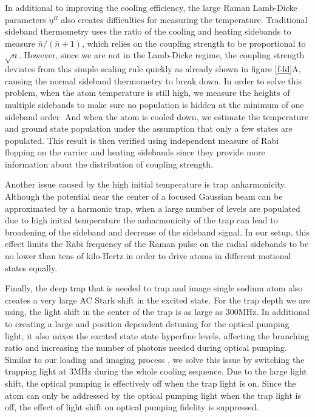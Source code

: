 \documentclass[aps,prl,twocolumn,groupedaddress]{revtex4-1}
\begin{document}
In additional to improving the cooling efficiency, the large Raman Lamb-Dicke parameters $\eta^R$
also creates difficulties for measuring the temperature. Traditional sideband thermometry uses
the ratio of the cooling and heating sidebands to measure $\bar n / (\bar n + 1)$, which relies
on the coupling strength to be proportional to $\sqrt{n}$. However, since we are not in the
Lamb-Dicke regime, the coupling strength deviates from this simple scaling rule quickly as already
shown in figure \ref{f-ld}A, causing the normal sideband thermometry to break down.
In order to solve this problem, when the atom temperature is still high,
we measure the heights of multiple sidebands to make sure no population is hidden at the
minimum of one sideband order. And when the atom is cooled down, we estimate the temperature
and ground state population under the assumption that only a few states are populated.
This result is then verified using independent measure of Rabi flopping on the carrier and heating
sidebands since they provide more information about the distribution of coupling strength.

Another issue caused by the high initial temperature is trap anharmonicity.
Although the potential near the center of a focused Gaussian beam can be approximated
by a harmonic trap, when a large number of levels are populated due to high initial temperature
the anharmonicity of the trap can lead to broadening of the sideband and decrease of
the sideband signal. In our setup, this effect limits the Rabi frequency of the Raman pulse
on the radial sidebands to be no lower than tens of kilo-Hertz in order to drive atoms in
different motional states equally.

Finally, the deep trap that is needed to trap and image single sodium atom also creates
a very large AC Stark shift in the excited state. For the trap depth we are using, the
light shift in the center of the trap is as large as $300\text{MHz}$.
In additional to creating a large and position dependent detuning for the optical pumping light,
it also mixes the excited state state hyperfine levels,
affecting the branching ratio and increasing the number of photons needed during optical pumping.
Similar to our loading and imaging process \cite{Hutzler2016},
we solve this issue by switching the trapping light at $3\text{MHz}$
during the whole cooling sequence.
Due to the large light shift, the optical pumping is effectively off when the trap light is on.
Since the atom can only be addressed by the optical pumping light when the trap light is off,
the effect of light shift on optical pumping fidelity is suppressed.
\end{document}

